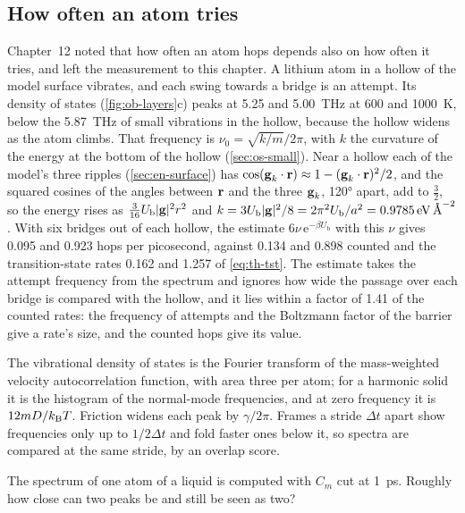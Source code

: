 \subsection*{How often an atom tries}

Chapter~12 noted that how often an atom hops depends also on how often it
tries, and left the measurement to this chapter. A lithium atom in a
hollow of the model surface vibrates, and each swing towards a bridge is
an attempt. Its density of states (\cref{fig:ob-layers}c) peaks at 5.25
and \SI{5.00}{\tera\hertz} at 600 and \SI{1000}{\kelvin}, below the
\SI{5.87}{\tera\hertz} of small vibrations in the hollow, because the
hollow widens as the atom climbs. That frequency is $\nu_0 =
\sqrt{k/m}/2\pi$, with $k$ the curvature of the energy at the bottom of
the hollow (\cref{sec:os-small}). Near a hollow each of the model's three
ripples (\cref{sec:en-surface}) has $\cos(\bm{\mathrm{g}}_k\cdot\bm{\mathrm{r}}) \approx 1 -
(\bm{\mathrm{g}}_k\cdot\bm{\mathrm{r}})^2/2$, and the squared cosines of the angles between
$\bm{\mathrm{r}}$ and the three $\bm{\mathrm{g}}_k$, \ang{120} apart, add to $\frac32$, so the
energy rises as $\frac{3}{16}U_{\mathrm b}\lvert\bm{\mathrm{g}}\rvert^2r^2$ and $k =
3U_{\mathrm b}\lvert\bm{\mathrm{g}}\rvert^2/8 = 2\pi^2U_{\mathrm b}/a^2 =
\SI{0.9785}{\electronvolt\per\angstrom\squared}$. With six bridges out of each hollow,
the estimate $6\nu\,\mathrm{e}^{-\beta U_{\mathrm b}}$ with this $\nu$
gives 0.095 and 0.923 hops per picosecond, against 0.134 and 0.898
counted and the transition-state rates 0.162 and 1.257 of
\cref{eq:th-tst}. The estimate takes the attempt frequency from the
spectrum and ignores how wide the passage over each bridge is compared
with the hollow, and it lies within a factor of 1.41 of the counted
rates: the frequency of attempts and the Boltzmann factor of the barrier
give a rate's size, and the counted hops give its value.

\begin{keyidea}
The vibrational density of states is the Fourier transform of the
mass-weighted velocity autocorrelation function, with area three per
atom; for a harmonic solid it is the histogram of the normal-mode
frequencies, and at zero frequency it is $12mD/k_{\mathrm{B}} T$. Friction widens
each peak by $\gamma/2\pi$. Frames a stride $\Delta t$ apart show
frequencies only up to $1/2\Delta t$ and fold faster ones below it, so
spectra are compared at the same stride, by an overlap score.
\end{keyidea}


\begin{selfcheck}
The spectrum of one atom of a liquid is computed with $C_m$ cut at
\SI{1}{\pico\second}. Roughly how close can two peaks be and still be
seen as two?
\end{selfcheck}
